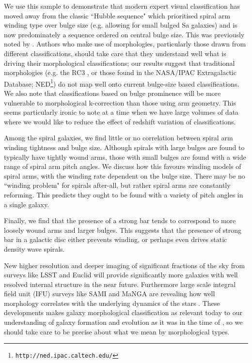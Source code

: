 \documentclass[usenatbib]{mn2e}
\begin{document}
 We use this sample to demonstrate that modern expert visual classification has moved away from the classic ``Hubble sequence" which prioritised spiral arm winding type over bulge size (e.g. allowing for small bulged Sa galaxies) and is now predominately a sequence ordered on central bulge size. This was previously noted by \citet{Willett2013}. Authors who make use of morphologies, particularly those drawn from different classifications, should take care that they understand well what is driving their morphological classifications; our results suggest that traditional morphologies (e.g. the RC3 \citep{1991rc3..book.....D}, or those found in the NASA/IPAC Extragalactic Database; NED\footnote{\tt http://ned.ipac.caltech.edu/}) do not map well onto current bulge-size based classifications. We also note that classifications based on bulge prominence will be more vulnerable to morphological k-correction 
than those using arm geometry. This seems particularly ironic to note at a time when we have large volumes of data where we would like to reduce the effect of redshift variation of classifications. 
 
Among the spiral galaxies, we find little or no correlation between spiral arm winding tightness and bulge size. Although spirals with large bulges are found to typically have tightly wound  arms, those with small bulges are found with a wide range of spiral arm pitch angles. We discuss how this favours winding models of spiral arms, with the winding rate dependent on the bulge size. There may be no ``winding problem" for spirals after-all, but rather spiral arms are constantly reforming. This predicts they ought to be found with a variety of pitch angles in a single galaxy. 

Finally, we find that the presence of a strong bar tends to correspond to more loosely wound arms and larger bulges. This suggests that the presence of strong bar in a galactic disc either prevents winding, or perhaps even drives static density wave spirals. 

 New higher resolution and deeper imaging of significant fractions of the sky from surveys like LSST and Euclid will provide significantly more galaxies with well resolved internal structure in the near future. Furthermore large scale integral field unit (IFU) surveys like SAMI \citep{Bryant2015} and MaNGA \citep{Bundy2015} are revealing how well morphology correlates with the underlying dynamics of the stars \citep{Foster2018}. These developments makes galaxy morphological classification as relevant today to our understanding of galaxy formation and evolution as it was in the time of \citet{Hubble1926}, so we should take care to be precise about what we mean by morphological types. %
  
\end{document}
